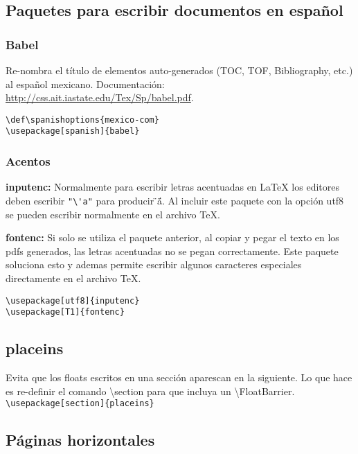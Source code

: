 \documentclass[12pt, a4paper,twoside]{article} %
\def\spanishoptions{mexico-com}
\begin{document}
\subsection{Paquetes para escribir documentos en español}

\subsubsection{Babel}

Re-nombra el título de elementos auto-generados (TOC, TOF, Bibliography, etc.) al español mexicano. Documentación: \url{http://css.ait.iastate.edu/Tex/Sp/babel.pdf}.\\

\begin{lstlisting}
\def\spanishoptions{mexico-com}
\usepackage[spanish]{babel}
\end{lstlisting}

\subsubsection{Acentos}

\textbf{inputenc:} Normalmente para escribir letras acentuadas en LaTeX los editores deben escribir \lstinline$"\'a"$ para producir \"{}á\"{}. Al incluir este paquete con la opción utf8 se pueden escribir normalmente en el archivo TeX.

\textbf{fontenc:} Si solo se utiliza el paquete anterior, al copiar y pegar el texto en los pdfs generados, las letras acentuadas no se pegan correctamente. Este paquete soluciona esto y ademas permite escribir algunos caracteres especiales directamente en el archivo TeX.\\

\begin{lstlisting}
\usepackage[utf8]{inputenc}
\usepackage[T1]{fontenc}
\end{lstlisting}

\subsection{placeins}

Evita que los floats escritos en una sección aparescan en la siguiente. Lo que hace es re-definir el comando \textbackslash{}section para que incluya un \textbackslash{}FloatBarrier.\\

\noindent\lstinline$\usepackage[section]{placeins}$

\subsection{Páginas horizontales}
\end{document}
